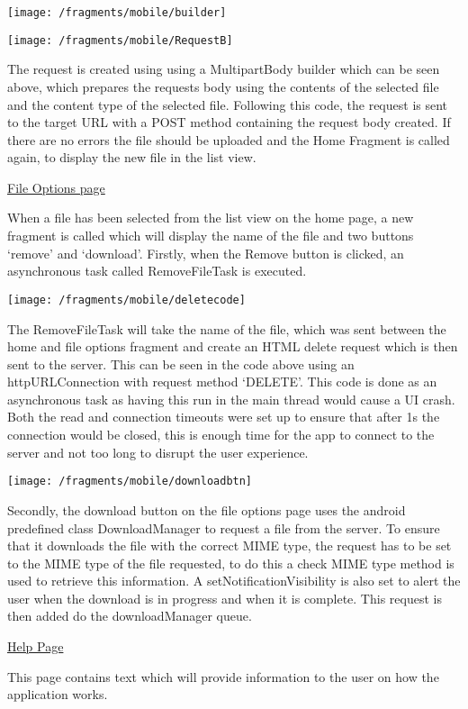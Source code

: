 \documentclass{article}
\begin{document}
\texttt{[image: /fragments/mobile/builder]}

\texttt{[image: /fragments/mobile/RequestB]}

The request is created using using a MultipartBody builder which can be seen above, which prepares the requests body using the contents of the selected file and the content type of the selected file. Following this code, the request is sent to the target URL with a POST method containing the request body created. If there are no errors the file should be uploaded and the Home Fragment is called again, to display the new file in the list view. 

\underline{File Options page}

When a file has been selected from the list view on the home page, a new fragment is called which will display the name of the file and two buttons ‘remove’ and ‘download’. Firstly, when the Remove button is clicked, an asynchronous task called RemoveFileTask is executed. 

\texttt{[image: /fragments/mobile/deletecode]}

The RemoveFileTask will take the name of the file, which was sent between the home and file options fragment and create an HTML delete request which is then sent to the server. This can be seen in the code above using an httpURLConnection with request method ‘DELETE’. This code is done as an asynchronous task as having this run in the main thread would cause a UI crash. Both the read and connection timeouts were set up to ensure that after 1s the connection would be closed, this is enough time for the app to connect to the server and not too long to disrupt the user experience.

\texttt{[image: /fragments/mobile/downloadbtn]}

Secondly, the download button on the file options page uses the android predefined class DownloadManager to request a file from the server. To ensure that it downloads the file with the correct MIME type, the request has to be set to the MIME type of the file requested, to do this a check MIME type method is used to retrieve this information. A setNotificationVisibility is also set to alert the user when the download is in progress and when it is complete. This request is then added do the downloadManager queue. 

\underline{Help Page}

This page contains text which will provide information to the user on how the application works.  
\end{document}
